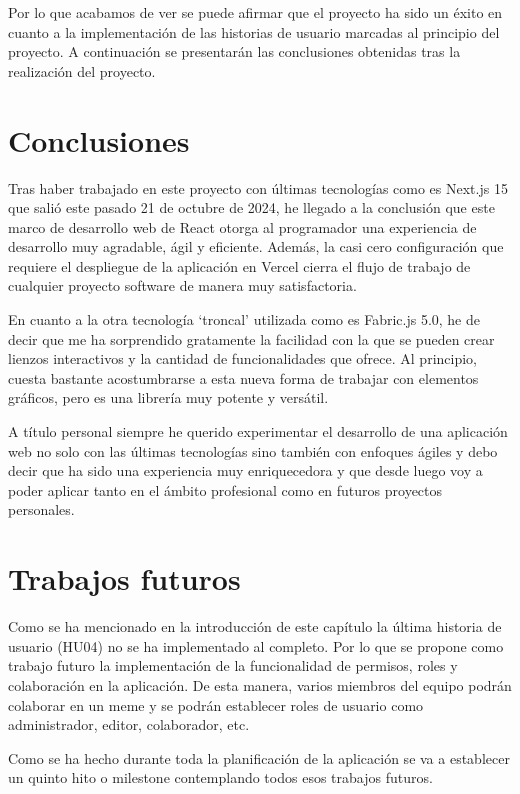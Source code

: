 Por lo que acabamos de ver se puede afirmar que el proyecto ha sido un éxito en cuanto a la implementación de las historias de usuario marcadas al principio del proyecto. A continuación se presentarán las conclusiones obtenidas tras la realización del proyecto.

\section{Conclusiones}

Tras haber trabajado en este proyecto con últimas tecnologías como es Next.js 15 que salió este pasado 21 de octubre de 2024, he llegado a la conclusión que este marco de desarrollo web de React otorga al programador una experiencia de desarrollo muy agradable, ágil y eficiente. Además, la casi cero configuración que requiere el despliegue de la aplicación en Vercel cierra el flujo de trabajo de cualquier proyecto software de manera muy satisfactoria.

En cuanto a la otra tecnología ‘troncal’ utilizada como es Fabric.js 5.0, he de decir que me ha sorprendido gratamente la facilidad con la que se pueden crear lienzos interactivos y la cantidad de funcionalidades que ofrece. Al principio, cuesta bastante acostumbrarse a esta nueva forma de trabajar con elementos gráficos, pero es una librería muy potente y versátil.

A título personal siempre he querido experimentar el desarrollo de una aplicación web no solo con las últimas tecnologías sino también con enfoques ágiles y debo decir que ha sido una experiencia muy enriquecedora y que desde luego voy a poder aplicar tanto en el ámbito profesional como en futuros proyectos personales.

\section{Trabajos futuros}

Como se ha mencionado en la introducción de este capítulo la última historia de usuario (HU04) no se ha implementado al completo. Por lo que se propone como trabajo futuro la implementación de la funcionalidad de permisos, roles y colaboración en la aplicación. De esta manera, varios miembros del equipo podrán colaborar en un meme y se podrán establecer roles de usuario como administrador, editor, colaborador, etc.

Como se ha hecho durante toda la planificación de la aplicación se va a establecer un quinto hito o milestone contemplando todos esos trabajos futuros.

